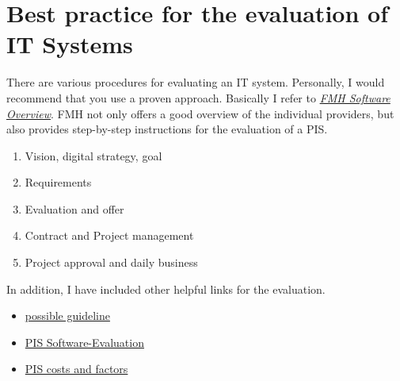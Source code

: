 \documentclass{report}
\begin{document}
\section{Best practice for the evaluation of IT Systems}
There are various procedures for evaluating an IT system. Personally, I would recommend that you use a proven approach. 
Basically I refer to \textit{\href{https://www.fmhservices.ch/softwarekatalog}{FMH Software Overview}}. 
FMH not only offers a good overview of the individual providers, but also provides step-by-step instructions for the evaluation of a PIS.
\begin{enumerate}
   \item Vision, digital strategy, goal
   \item Requirements
   \item Evaluation and offer
   \item Contract and Project management
   \item Project approval and daily business
\end{enumerate}

In addition, I have included other helpful links for the evaluation. 
\begin{itemize}
   \item \href{https://gaeso.ch/partnernews/harte-fakten-sachen-praxissoftware }{possible guideline}
   \item \href{https://www.gryps.ch/produkte/praxissoftware-196/?gclid=EAIaIQobChMI05zh7t7t6wIViN4YCh11fwA3EAAYAyAAEgLCTfD_BwE}{PIS Software-Evaluation}
   \item \href{https://www.gryps.ch/produkte/praxissoftware-196/praxissoftware-kosten/}{PIS costs and factors}
\end{itemize}
\end{document}
